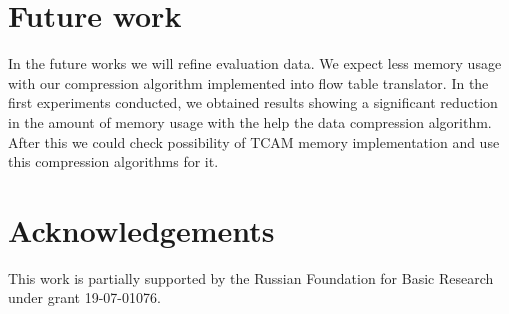 \documentclass[conference]{IEEEtran}
\begin{document}
    \section{Future work}
        In the future works we will refine evaluation data. 
        We expect less memory usage with our compression algorithm implemented into flow table translator. 
        In the first experiments conducted, we obtained results showing a significant reduction in the amount 
        of memory usage with the help the data compression algorithm. After this we could check possibility 
        of TCAM memory implementation and use this compression algorithms for it.
    \section{Acknowledgements}
        This work is partially supported by the Russian Foundation for Basic Research under grant 19-07-01076.
\printbibliography{}
\end{document}
